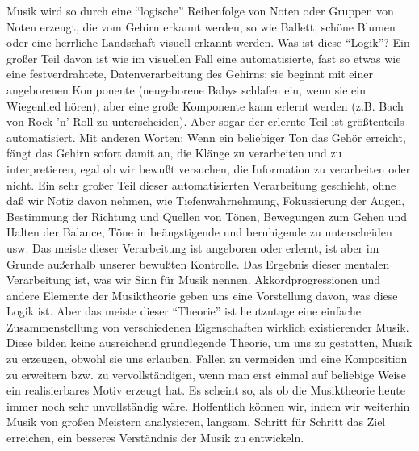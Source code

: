 Musik wird so durch eine \enquote{logische} Reihenfolge von Noten oder Gruppen von Noten erzeugt, die vom Gehirn erkannt werden, so wie Ballett, schöne Blumen oder eine herrliche Landschaft visuell erkannt werden.
Was ist diese \enquote{Logik}?
Ein großer Teil davon ist wie im visuellen Fall eine automatisierte, fast so etwas wie eine festverdrahtete, Datenverarbeitung des Gehirns; sie beginnt mit einer angeborenen Komponente (neugeborene Babys schlafen ein, wenn sie ein Wiegenlied hören), aber eine große Komponente kann erlernt werden (z.B. Bach von Rock 'n' Roll zu unterscheiden).
Aber sogar der erlernte Teil ist größtenteils automatisiert.
Mit anderen Worten: Wenn ein beliebiger Ton das Gehör erreicht, fängt das Gehirn sofort damit an, die Klänge zu verarbeiten und zu interpretieren, egal ob wir bewußt versuchen, die Information zu verarbeiten oder nicht.
Ein sehr großer Teil dieser automatisierten Verarbeitung geschieht, ohne daß wir Notiz davon nehmen, wie Tiefenwahrnehmung, Fokussierung der Augen, Bestimmung der Richtung und Quellen von Tönen, Bewegungen zum Gehen und Halten der Balance, Töne in beängstigende und beruhigende zu unterscheiden usw.
Das meiste dieser Verarbeitung ist angeboren oder erlernt, ist aber im Grunde außerhalb unserer bewußten Kontrolle.
Das Ergebnis dieser mentalen Verarbeitung ist, was wir Sinn für Musik nennen.
Akkordprogressionen und andere Elemente der Musiktheorie geben uns eine Vorstellung davon, was diese Logik ist.
Aber das meiste dieser \enquote{Theorie} ist heutzutage eine einfache Zusammenstellung von verschiedenen Eigenschaften wirklich existierender Musik.
Diese bilden keine ausreichend grundlegende Theorie, um uns zu gestatten, Musik zu erzeugen, obwohl sie uns erlauben, Fallen zu vermeiden und eine Komposition zu erweitern bzw. zu vervollständigen, wenn man erst einmal auf beliebige Weise ein realisierbares Motiv erzeugt hat.
Es scheint so, als ob die Musiktheorie heute immer noch sehr unvollständig wäre.
Hoffentlich können wir, indem wir weiterhin Musik von großen Meistern analysieren, langsam, Schritt für Schritt das Ziel erreichen, ein besseres Verständnis der Musik zu entwickeln.




